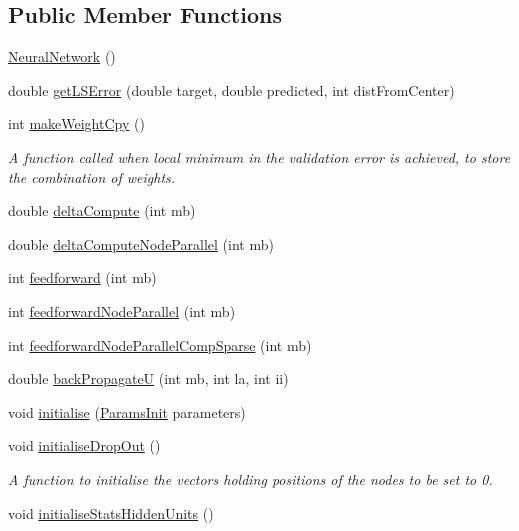 \subsection*{Public Member Functions}
\begin{DoxyCompactItemize}
\item 
\hyperlink{classNeuralNetwork_accce4a7728e89a009a9d4ca1758c9b9d}{Neural\+Network} ()
\item 
double \hyperlink{classNeuralNetwork_a3c92371fb8eb9363460223b67f2716f4}{get\+L\+S\+Error} (double target, double predicted, int dist\+From\+Center)
\item 
int \hyperlink{classNeuralNetwork_a30196e8390fead450b9495b3a782b198}{make\+Weight\+Cpy} ()
\begin{DoxyCompactList}\small\item\em A function called when local minimum in the validation error is achieved, to store the combination of weights. \end{DoxyCompactList}\item 
double \hyperlink{classNeuralNetwork_a49f0a71b2cfd1bd2a4af986354fa103c}{delta\+Compute} (int mb)
\item 
double \hyperlink{classNeuralNetwork_aff3f167f69f75a74ce3c425b8783d321}{delta\+Compute\+Node\+Parallel} (int mb)
\item 
int \hyperlink{classNeuralNetwork_ae3d909ef30a5c179a236571e126aa841}{feedforward} (int mb)
\item 
int \hyperlink{classNeuralNetwork_aad8fc497e54c397d3e4e91376e02e939}{feedforward\+Node\+Parallel} (int mb)
\item 
int \hyperlink{classNeuralNetwork_a82af0b25c1099ac3818a36911b63e8db}{feedforward\+Node\+Parallel\+Comp\+Sparse} (int mb)
\item 
double \hyperlink{classNeuralNetwork_a9d80cfaedb341a1a94e5b932665904d4}{back\+PropagateU} (int mb, int la, int ii)
\item 
void \hyperlink{classNeuralNetwork_ab72a0bebc4933c5e495636fe15d33982}{initialise} (\hyperlink{classParamsInit}{Params\+Init} parameters)
\item 
void \hyperlink{classNeuralNetwork_a4e078c8f704a0118f9ed9457b5e6c74d}{initialise\+Drop\+Out} ()
\begin{DoxyCompactList}\small\item\em A function to initialise the vectors holding positions of the nodes to be set to 0. \end{DoxyCompactList}\item 
void \hyperlink{classNeuralNetwork_ae27621b39d0afef732ca36e5ab0a6b73}{initialise\+Stats\+Hidden\+Units} ()

\end{DoxyCompactItemize}
